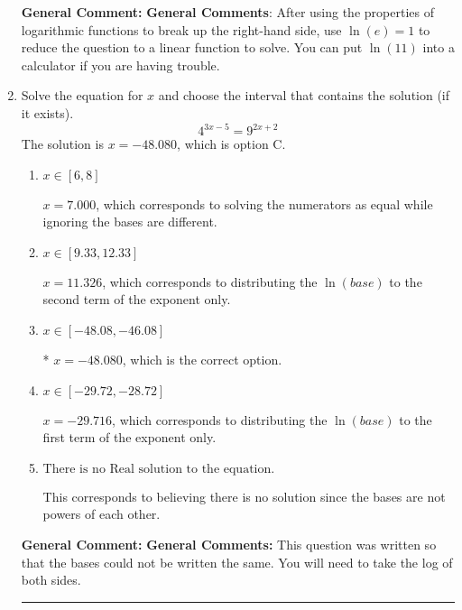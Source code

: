 \documentclass{extbook}[14pt]
\newcommand{\litem}[1]{\item #1

\rule{\textwidth}{0.4pt}}
\begin{document}
\begin{enumerate}
{\textbf{General Comment:} \textbf{General Comments}: After using the properties of logarithmic functions to break up the right-hand side, use $\ln(e) = 1$ to reduce the question to a linear function to solve. You can put $\ln(11)$ into a calculator if you are having trouble.
}
\litem{
Solve the equation for $x$ and choose the interval that contains the solution (if it exists).
\[ 4^{3x-5} = 9^{2x+2} \]
The solution is \( x = -48.080 \), which is option C.\begin{enumerate}[label=\Alph*.]
\item \( x \in [6, 8] \)

$x = 7.000$, which corresponds to solving the numerators as equal while ignoring the bases are different.
\item \( x \in [9.33, 12.33] \)

$x = 11.326$, which corresponds to distributing the $\ln(base)$ to the second term of the exponent only.
\item \( x \in [-48.08, -46.08] \)

* $x = -48.080$, which is the correct option.
\item \( x \in [-29.72, -28.72] \)

$x = -29.716$, which corresponds to distributing the $\ln(base)$ to the first term of the exponent only.
\item \( \text{There is no Real solution to the equation.} \)

This corresponds to believing there is no solution since the bases are not powers of each other.
\end{enumerate}

\textbf{General Comment:} \textbf{General Comments:} This question was written so that the bases could not be written the same. You will need to take the log of both sides.
}
\end{enumerate}
\end{document}
